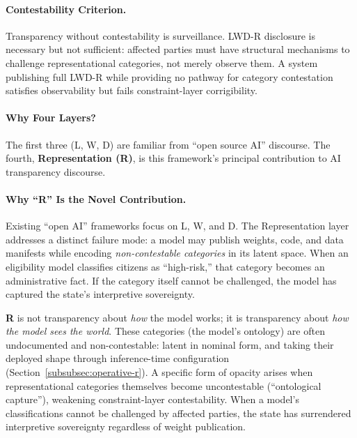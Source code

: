 \documentclass{article}
\theoremstyle{definition}
\begin{document}
\paragraph{Contestability Criterion.} Transparency without contestability is surveillance. LWD-R disclosure is necessary but not sufficient: affected parties must have structural mechanisms to challenge representational categories, not merely observe them. A system publishing full LWD-R while providing no pathway for category contestation satisfies observability but fails constraint-layer corrigibility.

\paragraph{Why Four Layers?} The first three (L, W, D) are familiar from ``open source AI'' discourse. The fourth, \textbf{Representation (R)}, is this framework's principal contribution to AI transparency discourse.

\paragraph{Why ``R'' Is the Novel Contribution.} Existing ``open AI'' frameworks focus on L, W, and D. The Representation layer addresses a distinct failure mode: a model may publish weights, code, and data manifests while encoding \textit{non-contestable categories} in its latent space. When an eligibility model classifies citizens as ``high-risk,'' that category becomes an administrative fact. If the category itself cannot be challenged, the model has captured the state's interpretive sovereignty.

\textbf{R} is not transparency about \textit{how} the model works; it is transparency about \textit{how the model sees the world}. These categories (the model's ontology) are often undocumented and non-contestable: latent in nominal form, and taking their deployed shape through inference-time configuration (Section~\ref{subsubsec:operative-r}). A specific form of opacity arises when representational categories themselves become uncontestable (``ontological capture''), weakening constraint-layer contestability. When a model's classifications cannot be challenged by affected parties, the state has surrendered interpretive sovereignty regardless of weight publication.
\end{document}
